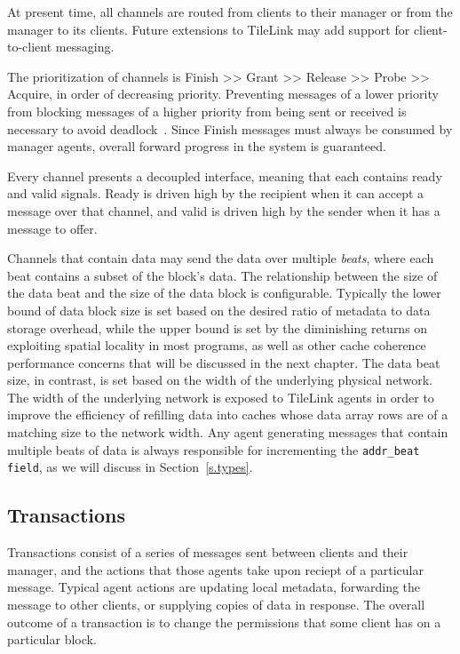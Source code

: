 At present time, all channels are routed from clients to their manager or from the manager to its clients.
Future extensions to TileLink may add support for client-to-client messaging.

The prioritization of channels is Finish >> Grant >> Release >> Probe >> Acquire, in order of decreasing priority.
Preventing messages of a lower priority from blocking messages of a higher priority from being sent or received is necessary to avoid deadlock~\cite{sorin2011primer}.
Since Finish messages must always be consumed by manager agents, overall forward progress in the system is guaranteed.

Every channel presents a decoupled interface, meaning that each contains ready and valid signals.
Ready is driven high by the recipient when it can accept a message over that channel,
and valid is driven high by the sender when it has a message to offer.

Channels that contain data may send the data over multiple {\em beats}, where each beat contains a subset of the block's data.
The relationship between the size of the data beat and the size of the data block is configurable.
Typically the lower bound of data block size is set based on
the desired ratio of metadata to data storage overhead,
while the upper bound is set by the diminishing returns on exploiting spatial locality in most programs,
as well as other cache coherence performance concerns that will be discussed in the next chapter.
The data beat size, in contrast, is set based on the width of the underlying physical network.
The width of the underlying network is exposed to TileLink agents in order to
improve the efficiency of refilling data into caches whose data array rows are of a matching size to the network width.
Any agent generating messages that contain multiple beats of data is always responsible for incrementing the {\tt addr\_beat field}, as we will discuss in Section~\ref{s.types}.

\subsection{Transactions}

Transactions consist of a series of messages sent between clients and their manager, and the actions that those agents take upon reciept of a particular message.
Typical agent actions are updating local metadata, forwarding the message to other clients, or supplying copies of data in response.
The overall outcome of a transaction is to change the permissions that some client has on a particular block.

